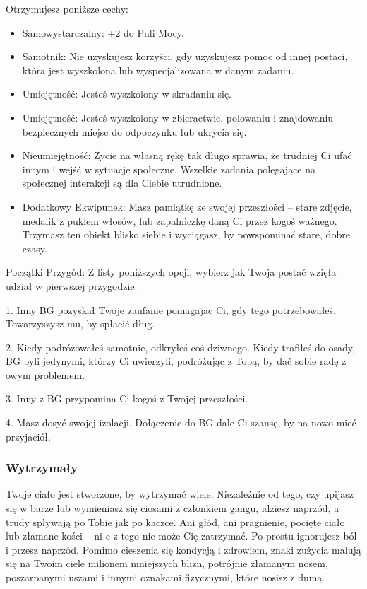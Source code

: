 Otrzymujesz poniższe cechy:
\begin{itemize}
    \item Samowystarczalny: +2 do Puli Mocy.
    \item Samotnik: Nie uzyskujesz korzyści, gdy uzyskujesz pomoc od innej postaci, która jest wyszkolona lub wyspecjalizowana w danym zadaniu.
    \item  Umiejętność: Jesteś wyszkolony w skradaniu się.
    \item  Umiejętność: Jesteś wyszkolony w zbieractwie, polowaniu i znajdowaniu bezpiecznych miejsc do odpoczynku lub ukrycia się.
    \item  Nieumiejętność: Życie na własną rękę tak długo sprawia, że trudniej Ci ufać innym i wejść w sytuacje społeczne. Wszelkie zadania polegające na społecznej interakcji są dla Ciebie utrudnione.
    \item  Dodatkowy Ekwipunek: Masz pamiątkę ze swojej przeszłości – stare zdjęcie, medalik z puklem włosów, lub zapalniczkę daną Ci przez kogoś ważnego. Trzymasz ten obiekt blisko siebie i wyciągasz, by powspominać stare, dobre czasy.
\end{itemize}

Początki Przygód: Z listy poniższych opcji, wybierz jak Twoja postać wzięła udział w pierwszej przygodzie.

1. Inny BG pozyskał Twoje zaufanie pomagajac Ci, gdy tego potrzebowałeś. Towarzyszysz mu, by spłacić dług.

2. Kiedy podróżowałeś samotnie, odkryłeś coś dziwnego. Kiedy trafiłeś do osady, BG byli jedynymi, którzy Ci uwierzyli, podróżując z 
Tobą, by dać sobie radę z owym problemem.

3. Inny z BG przypomina Ci kogoś z Twojej przeszłości.

4. Masz dosyć swojej izolacji. Dołączenie do BG dale Ci szansę, by na nowo mieć przyjaciół.

\subsubsection{Wytrzymały}

Twoje ciało jest stworzone, by wytrzymać wiele. Niezależnie od tego, czy upijasz się w barze lub wymieniasz się ciosami z członkiem gangu, idziesz naprzód, a trudy spływają po Tobie jak po kaczce. Ani głód, ani pragnienie, pocięte ciało lub złamane kości – ni c z tego nie może Cię zatrzymać. Po prostu ignorujesz ból i przesz naprzód. 
Pomimo cieszenia się kondycją i zdrowiem, znaki zużycia malują się na Twoim ciele milionem mniejszych blizn, potrójnie złamanym nosem, poszarpanymi uszami i innymi oznakami fizycznymi, które nosisz z dumą.

